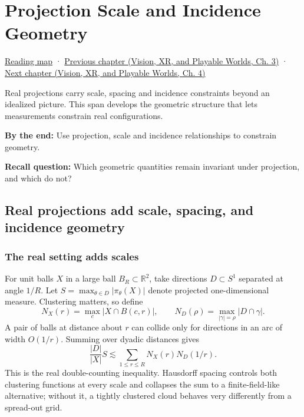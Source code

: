 \chapter{Projection Scale and Incidence Geometry}\label{04-visual-computing-ii-ch033-projection-scale-and-incidence-geometry}\hypertarget{04-visual-computing-ii-ch033}{}\label{stagechapter:04-visual-computing-ii-ch033}

\hypertarget{04-visual-computing-ii-ch033-projection-scale-and-incidence-geometry}{}

\hyperref[volume-reading-map]{Reading map} · \href{../07-Vision-XR-and-Playable-Worlds/main.pdf\#nameddest=04-visual-computing-ii-ch032-pose-estimation-and-robust-fitting}{Previous chapter (Vision, XR, and Playable Worlds, Ch. 3)} · \href{../07-Vision-XR-and-Playable-Worlds/main.pdf\#nameddest=04-visual-computing-ii-ch034-learned-3d-shapes-and-scene-representations}{Next chapter (Vision, XR, and Playable Worlds, Ch. 4)}

Real projections carry scale, spacing and incidence constraints beyond an idealized picture. This span develops the geometric structure that lets measurements constrain real configurations.

\textbf{By the end:} Use projection, scale and incidence relationships to constrain geometry.

\textbf{Recall question:} Which geometric quantities remain invariant under projection, and which do not?

\section{Real projections add scale, spacing, and incidence geometry}\label{04-visual-computing-ii-ch033-real-projections-add-scale-spacing-and-incidence-geometry}

\hypertarget{04-visual-computing-ii-ch033-real-projections-add-scale-spacing-and-incidence-geometry}{}

\subsection{The real setting adds scales}\label{04-visual-computing-ii-ch033-the-real-setting-adds-scales}

\hypertarget{04-visual-computing-ii-ch033-the-real-setting-adds-scales}{}

For unit balls \(X\) in a large ball \(B_R\subset\mathbb R^2\), take directions \(D\subset S^1\) separated at angle \(1/R\). Let \(S=\max_{\theta\in D}|\pi_\theta(X)|\) denote projected one-dimensional measure. Clustering matters, so define \[N_X(r)=\max_c|X\cap B(c,r)|,\qquad
N_D(\rho)=\max_{|\gamma|=\rho}|D\cap\gamma|.\] A pair of balls at distance about \(r\) can collide only for directions in an arc of width \(O(1/r)\). Summing over dyadic distances gives \[\frac{|D|}{|X|}S\lesssim\sum_{1\le r\le R}N_X(r)N_D(1/r).\] This is the real double-counting inequality. Hausdorff spacing controls both clustering functions at every scale and collapses the sum to a finite-field-like alternative; without it, a tightly clustered cloud behaves very differently from a spread-out grid.

